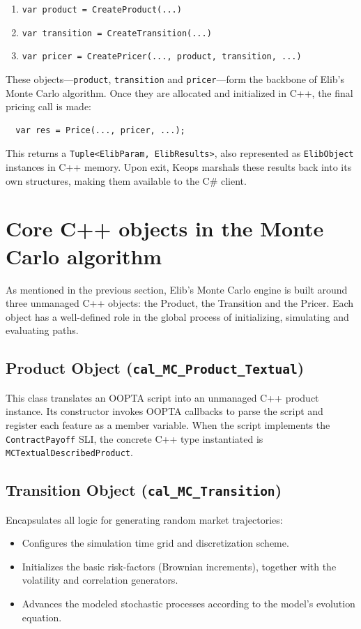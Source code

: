\documentclass[11pt]{article}
\begin{document}
\begin{enumerate}
  \item \texttt{var product    = CreateProduct(...)}  
  \item \texttt{var transition = CreateTransition(...)}  
  \item \texttt{var pricer     = CreatePricer(..., product, transition, ...)}  
\end{enumerate}

These objects—\texttt{product}, \texttt{transition} and \texttt{pricer}—form the backbone of Elib’s Monte Carlo algorithm.  Once they are allocated and initialized in C++, the final pricing call is made:
\begin{verbatim}
  var res = Price(..., pricer, ...);
\end{verbatim}
This returns a \texttt{Tuple<ElibParam, ElibResults>}, also represented as \texttt{ElibObject} instances in C++ memory.  Upon exit, Keops marshals these results back into its own structures, making them available to the C\# client.

\section{Core C++ objects in the Monte Carlo algorithm}

As mentioned in the previous section, Elib’s Monte Carlo engine is built around three unmanaged C++ objects: the Product, the Transition and the Pricer. Each object has a well-defined role in the global process of initializing, simulating and evaluating paths.

\subsection{Product Object (\texttt{cal\_MC\_Product\_Textual})}
This class translates an OOPTA script into an unmanaged C++ product instance. Its constructor invokes OOPTA callbacks to parse the script and register each feature as a member variable. When the script implements the \texttt{ContractPayoff} SLI, the concrete C++ type instantiated is \texttt{MCTextualDescribedProduct}.


\subsection{Transition Object (\texttt{cal\_MC\_Transition})}
Encapsulates all logic for generating random market trajectories:
\begin{itemize}
  \item Configures the simulation time grid and discretization scheme.
  \item Initializes the basic risk-factors (Brownian increments), together with the volatility and correlation generators.
  \item Advances the modeled stochastic processes according to the model's evolution equation.
\end{itemize}
\end{document}
